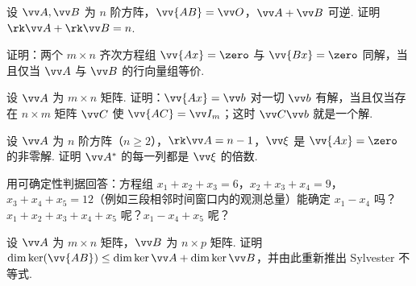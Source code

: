 {\begin{exB}
			\item\label{ex:sol:B10} 设 $\vv A,\vv B$ 为 $n$ 阶方阵，$\vv{AB}=\vv O$，$\vv A+\vv B$ 可逆. 证明 $\rk\vv A+\rk\vv B=n$.
			\item\label{ex:sol:B11} 证明：两个 $m\times n$ 齐次方程组 $\vv{Ax}=\zero$ 与 $\vv{Bx}=\zero$ 同解，当且仅当 $\vv A$ 与 $\vv B$ 的行向量组等价.
			\item\label{ex:sol:B12} 设 $\vv A$ 为 $m\times n$ 矩阵. 证明：$\vv{Ax}=\vv b$ 对一切 $\vv b$ 有解，当且仅当存在 $n\times m$ 矩阵 $\vv C$ 使 $\vv{AC}=\vv I_m$；这时 $\vv C\vv b$ 就是一个解.
			\item\label{ex:sol:B13} 设 $\vv A$ 为 $n$ 阶方阵（$n\ge2$），$\rk\vv A=n-1$，$\vv\xi$ 是 $\vv{Ax}=\zero$ 的非零解. 证明 $\vv A^*$ 的每一列都是 $\vv\xi$ 的倍数.
			\item\label{ex:sol:B14} 用可确定性判据回答：方程组 $x_1+x_2+x_3=6$，$x_2+x_3+x_4=9$，$x_3+x_4+x_5=12$（例如三段相邻时间窗口内的观测总量）能确定 $x_1-x_4$ 吗？$x_1+x_2+x_3+x_4+x_5$ 呢？$x_1-x_4+x_5$ 呢？
			\item\label{ex:sol:B15} 设 $\vv A$ 为 $m\times n$ 矩阵，$\vv B$ 为 $n\times p$ 矩阵. 证明 $\dim\ker(\vv{AB})\le\dim\ker\vv A+\dim\ker\vv B$，并由此重新推出 Sylvester 不等式.
		\end{exB}
		
}
